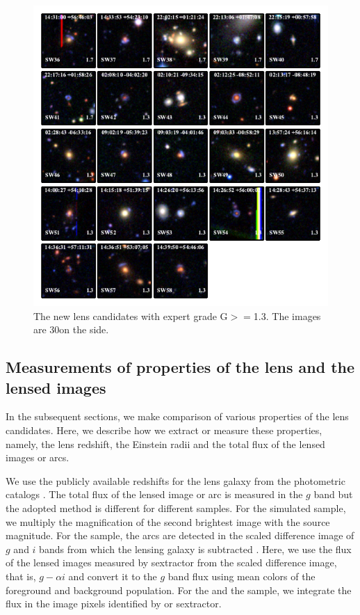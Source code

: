 \documentclass[useAMS,usenatbib,a4paper]{mn2e}
\begin{document}
\begin{figure}
\begin{center}
\includegraphics[scale=1.9]{sw-cfhtls-figs/lenscandfin_1.pdf}
\caption{ \label{fig:lc}
The new \sw lens candidates with expert grade G$>=$1.3. The images are
30\arcsec on the side.
}
\end{center}
\end{figure}

\subsection{Measurements of properties of the lens and the lensed images}
\label{sec:results:meas}

In the subsequent sections, we make comparison of various properties of the lens
candidates. Here, we describe how we extract or measure these properties, namely,
the lens redshift, the Einstein radii and the total flux of the lensed images or
arcs.

We use the publicly available redshifts for the lens galaxy from the
\cfhtls photometric catalogs \citep{Coupon2009}. The total flux of the
lensed image or arc is measured in the $g$ band but the adopted method
is different for different samples. For the simulated sample, we
multiply the magnification of the second brightest image with the source
magnitude. For the \rf sample, the arcs are detected in the scaled
difference image of $g$ and $i$ bands from which the lensing galaxy is
subtracted \citep[for details, see]{Gavazzi2014}. Here, we use the flux
of the lensed images measured by {\sc sextractor} from the scaled
difference image, that is, $g-\alpha i$ and convert it to the $g$ band
flux using mean colors of the foreground and background population. For
the \af and the \sw sample, we integrate the flux in the image pixels
identified by \af or {\sc sextractor}.
\end{document}
